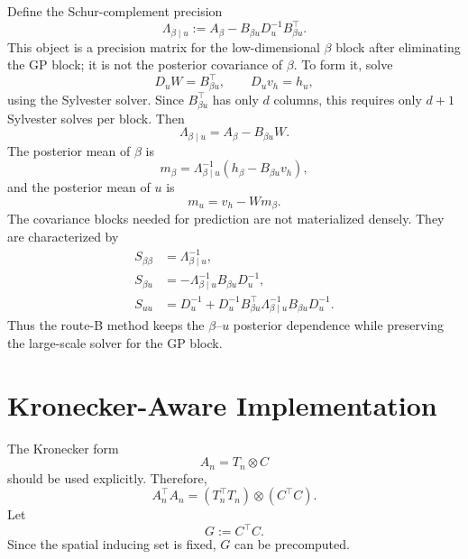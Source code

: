 \documentclass[12pt]{article}
\begin{document}
Define the Schur-complement precision
\begin{equation}
    \Lambda_{\beta\mid u}
    :=
    A_\beta-B_{\beta u}D_u^{-1}B_{\beta u}^\top.
    \label{eq:beta_schur_complement}
\end{equation}
This object is a precision matrix for the low-dimensional $\beta$ block after
eliminating the GP block; it is not the posterior covariance of $\beta$.
To form it, solve
\begin{equation}
    D_u W=B_{\beta u}^\top,
    \qquad
    D_uv_h=h_u,
    \label{eq:schur_sylvester_solves}
\end{equation}
using the Sylvester solver. Since $B_{\beta u}^\top$ has only $d$ columns, this requires
only $d+1$ Sylvester solves per block. Then
\begin{equation}
    \Lambda_{\beta\mid u}=A_\beta-B_{\beta u}W.
\end{equation}
The posterior mean of $\beta$ is
\begin{equation}
    m_\beta
    =
    \Lambda_{\beta\mid u}^{-1}
    \left(
        h_\beta-B_{\beta u}v_h
    \right),
    \label{eq:schur_beta_mean}
\end{equation}
and the posterior mean of $u$ is
\begin{equation}
    m_u
    =
    v_h-Wm_\beta.
    \label{eq:schur_u_mean}
\end{equation}
The covariance blocks needed for prediction are not materialized densely. They are
characterized by
\begin{align}
    S_{\beta\beta}&=\Lambda_{\beta\mid u}^{-1},
    \label{eq:Sbb_schur}\\
    S_{\beta u}&=-\Lambda_{\beta\mid u}^{-1}B_{\beta u}D_u^{-1},
    \label{eq:Sbu_schur}\\
    S_{uu}&=D_u^{-1}+D_u^{-1}B_{\beta u}^\top
    \Lambda_{\beta\mid u}^{-1}B_{\beta u}D_u^{-1}.
    \label{eq:Suu_schur}
\end{align}
Thus the route-B method keeps the $\beta$--$u$ posterior dependence while preserving the
large-scale solver for the GP block.


\section{Kronecker-Aware Implementation}
\label{sec:kronecker_aware_implementation}

The Kronecker form
\begin{equation}
    A_n=T_n\otimes C
\end{equation}
should be used explicitly. Therefore,
\begin{equation}
    A_n^\top A_n
    =
    (T_n^\top T_n)\otimes(C^\top C).
\end{equation}
Let
\begin{equation}
    G:=C^\top C.
\end{equation}
Since the spatial inducing set is fixed, $G$ can be precomputed.
\end{document}
